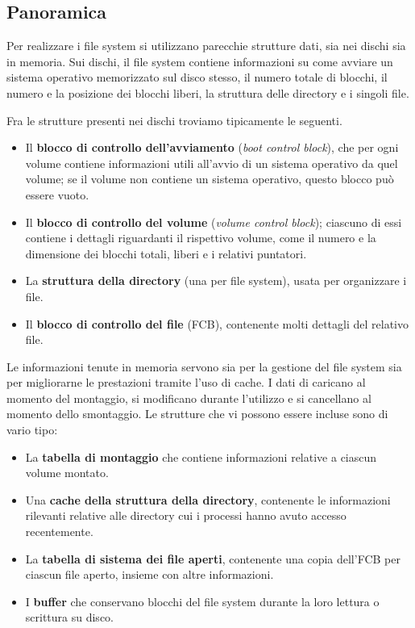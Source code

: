     \subsection{Panoramica}
        Per realizzare i file system si utilizzano parecchie strutture dati, sia nei dischi sia in memoria. Sui dischi, il file system contiene informazioni su come avviare un sistema operativo memorizzato sul disco stesso, il numero totale di blocchi, il numero e la posizione dei blocchi liberi, la struttura delle directory e i singoli file.
        
        Fra le strutture presenti nei dischi troviamo tipicamente le seguenti.
        \begin{itemize}
            \item Il \textbf{blocco di controllo dell'avviamento} (\textit{boot control block}), che per ogni volume contiene informazioni utili all'avvio di un sistema operativo da quel volume; se il volume non contiene un sistema operativo, questo blocco può essere vuoto.
            
            \item Il \textbf{blocco di controllo del volume} (\textit{volume control block}); ciascuno di essi contiene i dettagli riguardanti il rispettivo volume, come il numero e la dimensione dei blocchi totali, liberi e i relativi puntatori.
            
            \item La \textbf{struttura della directory} (una per file system), usata per organizzare i file.
            
            \item Il \textbf{blocco di controllo del file} (FCB), contenente molti dettagli del relativo file.
        \end{itemize}
        
        Le informazioni tenute in memoria servono sia per la gestione del file system sia per migliorarne le prestazioni tramite l'uso di cache. I dati di caricano al momento del montaggio, si modificano durante l'utilizzo e si cancellano al momento dello smontaggio. Le strutture che vi possono essere incluse sono di vario tipo:
        \begin{itemize}
            \item La \textbf{tabella di montaggio} che contiene informazioni relative a ciascun volume montato.
            
            \item Una \textbf{cache della struttura della directory}, contenente le informazioni rilevanti relative alle directory cui i processi hanno avuto accesso recentemente.
            
            \item La \textbf{tabella di sistema dei file aperti}, contenente una copia dell'FCB per ciascun file aperto, insieme con altre informazioni.
            
            \item I \textbf{buffer} che conservano blocchi del file system durante la loro lettura o scrittura su disco.
        \end{itemize}
        
